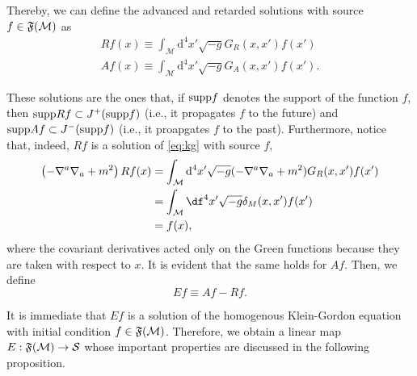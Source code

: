 Thereby, we can define the advanced and retarded solutions with source \(f\in{\mathfrak{F}}({\mathcal{M}})\) as
\begin{subequations}
    \begin{align}
        Rf(x)\equiv\int_\mathcal{M}\mathrm{d}^4x'\sqrt{-g}G_R(x,x')f(x')\\
        Af(x)\equiv\int_\mathcal{M}\mathrm{d}^4x'\sqrt{-g}G_A(x,x')f(x').
    \end{align}
\end{subequations}

These solutions are the ones that, if \(\mathrm{supp}f\) denotes the support of the function \(f\), then \(\mathrm{supp}Rf\subset J^+(\mathrm{supp}f)\) (i.e., it propagates \(f\) to the future) and \(\mathrm{supp}Af\subset J^-(\mathrm{supp}f)\) (i.e., it proapgates \(f\) to the past). Furthermore, notice that, indeed, \(Rf\) is a solution of \cref{eq:kg} with source \(f\),
\begin{subequations}
    \begin{align}
        \left(-\nabla^a\nabla_a+m^2\right)Rf(x)&=\int_\mathcal{M}\mathrm{d}^4x'\sqrt{-g}(-\nabla^a\nabla_a+m^2)G_R(x,x')f(x')\\
        &=\int_{\mathcal{M}}\df^4x'\sqrt{-g}\delta_M(x,x')f(x')\\
        &=f(x),
        \label{eq:Rf-fontef}
    \end{align}
\end{subequations}
where the covariant derivatives acted only on the Green functions because they are taken with respect to \(x\). It is evident that the same holds for \(Af\). Then, we define
\begin{equation}
    Ef\equiv Af-Rf.
\end{equation}

It is immediate that \(Ef\) is a solution of the homogenous Klein-Gordon equation with initial condition \(f\in{\mathfrak{F}}({\mathcal{M}})\). Therefore, we obtain a linear map \(E:{\mathfrak{F}}({\mathcal{M}})\to{\mathcal{S}}\) whose important properties are discussed in the following proposition.
\begin{proposition}
    
\end{proposition}